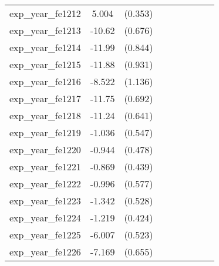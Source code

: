 {\begin{tabular}{l*{4}{cc}}
exp\_year\_fe1212&    5.004\sym{***}&  (0.353)&                  &         &                  &         &                  &         \\
exp\_year\_fe1213&   -10.62\sym{***}&  (0.676)&                  &         &                  &         &                  &         \\
exp\_year\_fe1214&   -11.99\sym{***}&  (0.844)&                  &         &                  &         &                  &         \\
exp\_year\_fe1215&   -11.88\sym{***}&  (0.931)&                  &         &                  &         &                  &         \\
exp\_year\_fe1216&   -8.522\sym{***}&  (1.136)&                  &         &                  &         &                  &         \\
exp\_year\_fe1217&   -11.75\sym{***}&  (0.692)&                  &         &                  &         &                  &         \\
exp\_year\_fe1218&   -11.24\sym{***}&  (0.641)&                  &         &                  &         &                  &         \\
exp\_year\_fe1219&   -1.036         &  (0.547)&                  &         &                  &         &                  &         \\
exp\_year\_fe1220&   -0.944\sym{*}  &  (0.478)&                  &         &                  &         &                  &         \\
exp\_year\_fe1221&   -0.869\sym{*}  &  (0.439)&                  &         &                  &         &                  &         \\
exp\_year\_fe1222&   -0.996         &  (0.577)&                  &         &                  &         &                  &         \\
exp\_year\_fe1223&   -1.342\sym{*}  &  (0.528)&                  &         &                  &         &                  &         \\
exp\_year\_fe1224&   -1.219\sym{**} &  (0.424)&                  &         &                  &         &                  &         \\
exp\_year\_fe1225&   -6.007\sym{***}&  (0.523)&                  &         &                  &         &                  &         \\
exp\_year\_fe1226&   -7.169\sym{***}&  (0.655)&                  &         &                  &         &                  &         \\

\end{tabular}}
